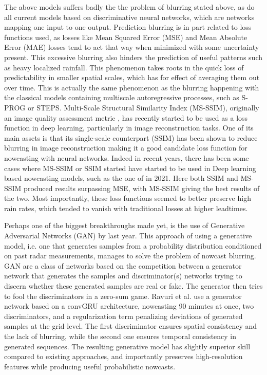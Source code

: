 The above models suffers badly the the problem of blurring stated above, as do all current models based on discriminative neural networks, which are networks mapping one input to one output. Prediction blurring is in part related to loss functions used, as losses like Mean Squared Error (MSE) and Mean Absolute Error (MAE) losses tend to act that way when minimized with some uncertainty present. This excessive blurring also hinders the prediction of useful patterns such as heavy localized rainfall. This phenomenon takes roots in the quick loss of predictability in smaller spatial scales, which has for effect of averaging them out over time. This is actually the same phenomenon as the blurring happening with the classical models containing multiscale autoregressive processes, such as S-PROG or STEPS. 
Multi-Scale Structural Similarity Index (MS-SSIM), originally an image quality assessment metric \cite{wang_multiscale_2003}, has recently started to be used as a loss function in deep learning, particularly in image reconstruction tasks. One of its main assets is that its single-scale counterpart (SSIM) has been shown to reduce blurring in image reconstruction \cite{zhao_loss_2017} making it a good candidate loss function for nowcasting with neural networks.  Indeed in recent years, there has been some cases where MS-SSIM or SSIM started have started to be used in Deep learning based nowcasting models, such as the one of \citet{yin_application_2021} in 2021. Here both SSIM and MS-SSIM produced results surpassing MSE, with MS-SSIM giving the best results of the two. Most importantly, these loss functions seemed to better preserve high rain rates, which tended to vanish with traditional losses at higher leadtimes. 

Perhaps one of the biggest breakthroughs made yet, is the use of Generative Adversarial Networks (GAN) by \citet{ravuri_skilful_2021} last year. This approach of using a generative model, i.e. one that generates samples from a probability distribution conditioned on past radar measurements, manages to solve the problem of nowcast blurring. GAN are a class of networks based on the competition between a generator network that generates the samples and discriminator(s) networks trying to discern whether these generated samples are real or fake. The generator then tries to fool the discriminators in a zero-sum game. Ravuri et al. use a generator network based on a convGRU architecture, nowcasting 90 minutes at once, two discriminators, and a regularization term penalizing deviations of generated samples at the grid level. The first discriminator ensures spatial consistency and the lack of blurring, while the second one ensures temporal consistency in generated sequences. The resulting generative model has slightly superior skill compared to existing approaches, and importantly preserves high-resolution features while producing useful probabilistic nowcasts. \cite{ravuri_skilful_2021}

